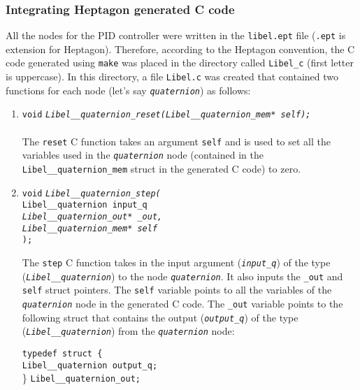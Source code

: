 \documentclass[10pt, a4paper]{article}
\newcommand{\textFunc}[1]{\texttt{\textit{#1}}}
\newcommand{\code}[1]{\texttt{#1}}
\begin{document}
    \subsubsection{Integrating Heptagon generated C code}
    \label{section:integrate-hept-c-code}
    All the nodes for the PID controller were written in the \code{libel.ept} file (\code{.ept} is extension for Heptagon). Therefore, according to the Heptagon convention, the C code generated using \code{make} was placed in the directory called \code{Libel\_c} (first letter is uppercase). In this directory, a file \code{Libel.c} was created that contained two functions for each node (let's say \textFunc{quaternion}) as follows:
    \begin{enumerate}
        \item \code{void} \quad \textFunc{Libel\_\_quaternion\_reset(Libel\_\_quaternion\_mem* self);} \\\\
            The \code{reset} C function takes an argument \code{self} and is used to set all the variables used in the \textFunc{quaternion} node (contained in the \code{Libel\_\_quaternion\_mem} struct in the generated C code) to zero.
        \item 
            \begin{tabbing}
                \code{void} \quad \textFunc{Libel\_\_quaternion\_step(} \\
                \code{\quad\quad Libel\_\_quaternion \quad input\_q}\\
                \textFunc{\quad \quad Libel\_\_quaternion\_out* \_out,}\\
                \textFunc{\quad \quad Libel\_\_quaternion\_mem* self}\\
                \code{);}
            \end{tabbing}
            The \code{step} C function takes in the input argument (\textFunc{input\_q}) of the type (\textFunc{Libel\_\_quaternion}) to the node \textFunc{quaternion}. It also inputs the \code{\_out} and \code{self} struct pointers. The \code{self} variable points to all the variables of the \textFunc{quaternion} node in the generated C code. The \code{\_out} variable points to the following struct that contains the output (\textFunc{output\_q}) of the type (\textFunc{Libel\_\_quaternion}) from the \textFunc{quaternion} node:
            \begin{tabbing}
                \code{typedef struct \{}\\
                \code{\quad Libel\_\_quaternion \quad output\_q;}\\
                \} \quad \code{Libel\_\_quaternion\_out;}
            \end{tabbing}
    \end{enumerate}
\end{document}
